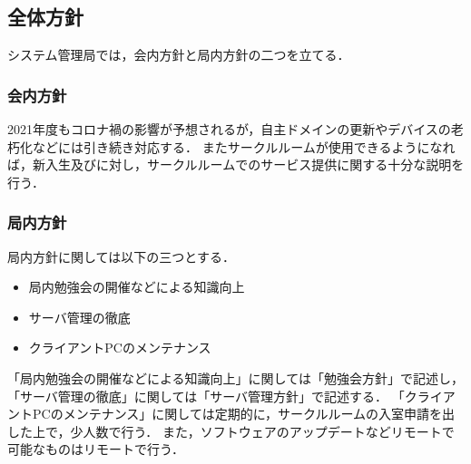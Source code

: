 \subsection*{全体方針}

システム管理局では，会内方針と局内方針の二つを立てる．

\subsubsection*{会内方針}
2021年度もコロナ禍の影響が予想されるが，自主ドメインの更新やデバイスの老朽化などには引き続き対応する．
またサークルルームが使用できるようになれば，新入生及び\secondGrade{}に対し，サークルルームでのサービス提供に関する十分な説明を行う．

\subsubsection*{局内方針}
局内方針に関しては以下の三つとする．
\begin{itemize}
  \item 局内勉強会の開催などによる知識向上
  \item サーバ管理の徹底
  \item クライアントPCのメンテナンス
\end{itemize}
「局内勉強会の開催などによる知識向上」に関しては「勉強会方針」で記述し，
「サーバ管理の徹底」に関しては「サーバ管理方針」で記述する．
「クライアントPCのメンテナンス」に関しては定期的に，サークルルームの入室申請を出した上で，少人数で行う．
また，ソフトウェアのアップデートなどリモートで可能なものはリモートで行う．
